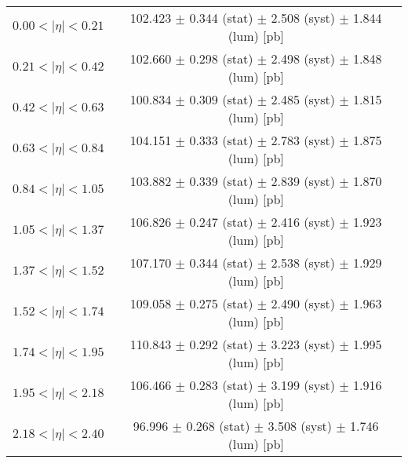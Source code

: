 \begin{tabular}{lc}
\hline
$0.00 < |\eta| <0.21$          & 102.423 $\pm$ 0.344 (stat) $\pm$ 2.508 (syst) $\pm$ 1.844 (lum) [pb]  \\
$0.21 < |\eta| <0.42$          & 102.660 $\pm$ 0.298 (stat) $\pm$ 2.498 (syst) $\pm$ 1.848 (lum) [pb]  \\
$0.42 < |\eta| <0.63$          & 100.834 $\pm$ 0.309 (stat) $\pm$ 2.485 (syst) $\pm$ 1.815 (lum) [pb]  \\
$0.63 < |\eta| <0.84$          & 104.151 $\pm$ 0.333 (stat) $\pm$ 2.783 (syst) $\pm$ 1.875 (lum) [pb]  \\
$0.84 < |\eta| <1.05$          & 103.882 $\pm$ 0.339 (stat) $\pm$ 2.839 (syst) $\pm$ 1.870 (lum) [pb]  \\
$1.05 < |\eta| <1.37$          & 106.826 $\pm$ 0.247 (stat) $\pm$ 2.416 (syst) $\pm$ 1.923 (lum) [pb]  \\
$1.37 < |\eta| <1.52$          & 107.170 $\pm$ 0.344 (stat) $\pm$ 2.538 (syst) $\pm$ 1.929 (lum) [pb]  \\
$1.52 < |\eta| <1.74$          & 109.058 $\pm$ 0.275 (stat) $\pm$ 2.490 (syst) $\pm$ 1.963 (lum) [pb]  \\
$1.74 < |\eta| <1.95$          & 110.843 $\pm$ 0.292 (stat) $\pm$ 3.223 (syst) $\pm$ 1.995 (lum) [pb]  \\
$1.95 < |\eta| <2.18$          & 106.466 $\pm$ 0.283 (stat) $\pm$ 3.199 (syst) $\pm$ 1.916 (lum) [pb]  \\
$2.18 < |\eta| <2.40$          & 96.996 $\pm$ 0.268 (stat) $\pm$ 3.508 (syst) $\pm$ 1.746 (lum) [pb]  \\
\hline
\end{tabular}
